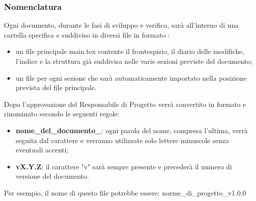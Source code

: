 	\subsubsection{Nomenclatura}
	Ogni documento, durante le fasi di sviluppo e verifica, sarà all'interno di una cartella specifica e suddiviso in diversi file in formato \glock{\LaTeX}:
	\begin{itemize}
		\item un file principale main.tex contente il frontespizio, il diario delle modifiche, l'indice e la struttura già suddivisa nelle varie sezioni previste del documento;
		\item un file per ogni sezione che sarà automaticamente importato nella posizione prevista del file principale.
	\end{itemize}
	Dopo l'approvazione del Responsabile di Progetto verrà convertito in formato  e rinominato secondo le seguenti regole:
	\begin{itemize}
		\item \textbf{nome\_del\_documento\_}: ogni parola del nome, compresa l'ultima, verrà seguita dal carattere  e verranno utilizzate solo lettere minuscole senza eventuali accenti;
		\item \textbf{vX.Y.Z}: il carattere "v" sarà sempre presente e precederà il numero di versione del documento.
	\end{itemize}
	Per esempio, il nome di questo file potrebbe essere: norme\_di\_progetto\_v1.0.0\\
	
